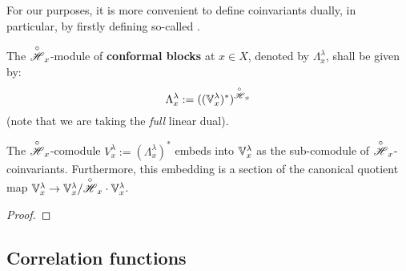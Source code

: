         For our purposes, it is more convenient to define coinvariants dually, in particular, by firstly defining so-called .
        \begin{definition} \label{def: conformal_blocks}
            The $\overset{\circ}{\mathscr{H}}_x$-module of \textbf{conformal blocks} at $x \in X$, denoted by $\Lambda_x^{\lambda}$, shall be given by:
                $$\Lambda_x^{\lambda} := ( ( \mathbb{V}_x^{\lambda} )^* )^{\overset{\circ}{\mathscr{H}}_x}$$
            (note that we are taking the \textit{full} linear dual). 
        \end{definition}
        \begin{proposition} \label{prop: conformal_blocks_and_coinvariants}
            The $\overset{\circ}{\mathscr{H}}_x$-comodule $V_x^{\lambda} := (\Lambda_x^{\lambda})^*$ embeds into $\mathbb{V}_x^{\lambda}$ as the sub-comodule of $\overset{\circ}{\mathscr{H}}_x$-coinvariants. Furthermore, this embedding is a section of the canonical quotient map $\mathbb{V}_x^{\lambda} \to \mathbb{V}_x^{\lambda}/\overset{\circ}{\mathscr{H}}_x \cdot \mathbb{V}_x^{\lambda}$.
        \end{proposition}
            \begin{proof}
                
            \end{proof}

    \subsection{Correlation functions}